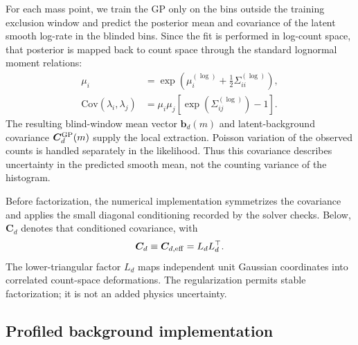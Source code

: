 For each mass point, we train the GP only on the bins outside the training
exclusion window and predict the posterior mean and covariance of the latent smooth
log-rate in the blinded bins. Since the fit is performed in log-count space, that
posterior is mapped back to count space through the standard lognormal moment
relations:
\begin{align}
\mu_i &= \exp\!\left(\mu^{(\log)}_i + \frac{1}{2}\Sigma^{(\log)}_{ii}\right), \\
\mathrm{Cov}(\lambda_i,\lambda_j)
&= \mu_i\mu_j\left[\exp\!\left(\Sigma^{(\log)}_{ij}\right)-1\right].
\end{align}
The resulting blind-window mean vector $\bm b_d(m)$ and latent-background
covariance $\bm C_d^{\rm GP}(m)$ supply the local extraction. Poisson variation
of the observed counts is handled separately in the likelihood. Thus this
covariance describes uncertainty in the predicted smooth mean, not the
counting variance of the histogram.

Before factorization, the numerical implementation symmetrizes the covariance
and applies the small diagonal conditioning recorded by the solver checks.
Below, $\bm C_d$ denotes that conditioned covariance, with
\begin{equation}
 \bm C_d\equiv\bm C_{d,\rm eff}=L_dL_d^\top.
 \label{eq:Cd-cholesky}
\end{equation}
The lower-triangular factor $L_d$ maps independent unit Gaussian coordinates
into correlated count-space deformations. The regularization permits stable
factorization; it is not an added physics uncertainty.

\subsection{Profiled background implementation}
\label{sec:v501-profile-implementation}

